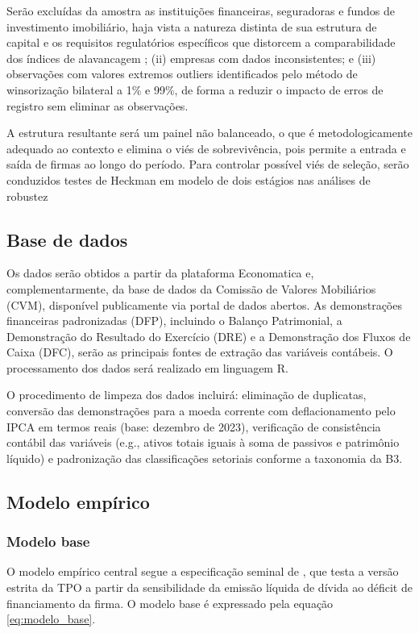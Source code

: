 \documentclass[a4paper,12pt]{article}
\begin{document}
Serão excluídas da amostra as instituições financeiras, seguradoras e fundos de investimento imobiliário, haja vista a natureza distinta de sua estrutura de capital e os requisitos regulatórios específicos que distorcem a comparabilidade dos índices de alavancagem \cite{AssafNeto2014}; (ii) empresas com dados inconsistentes; e (iii) observações com valores extremos outliers identificados pelo método de winsorização bilateral a 1\% e 99\%, de forma a reduzir o impacto de erros de registro sem eliminar as observações.

A estrutura resultante será um painel não balanceado, o que é metodologicamente adequado ao contexto e elimina o viés de sobrevivência, pois permite a entrada e saída de firmas ao longo do período. Para controlar possível viés de seleção, serão conduzidos testes de Heckman em modelo de dois estágios nas análises de robustez
\subsection{Base de dados}
Os dados serão obtidos a partir da plataforma Economatica e, complementarmente, da base de dados da Comissão de Valores Mobiliários (CVM), disponível publicamente via portal de dados abertos. As demonstrações financeiras padronizadas (DFP), incluindo o Balanço Patrimonial, a Demonstração do Resultado do Exercício (DRE) e a Demonstração dos Fluxos de Caixa (DFC), serão as principais fontes de extração das variáveis contábeis. O processamento dos dados será realizado em linguagem R.

O procedimento de limpeza dos dados incluirá: eliminação de duplicatas, conversão das demonstrações para a moeda corrente com deflacionamento pelo IPCA em termos reais (base: dezembro de 2023), verificação de consistência contábil das variáveis (e.g., ativos totais iguais à soma de passivos e patrimônio líquido) e padronização das classificações setoriais conforme a taxonomia da B3.
\subsection{Modelo empírico}
 
\subsubsection{Modelo base}
 
O modelo empírico central segue a especificação seminal de \cite{shyam1999}, que testa a versão estrita da TPO a partir da sensibilidade da emissão líquida de dívida ao déficit de financiamento da firma. O modelo base é expressado pela equação \ref{eq:modelo_base}.
 
\end{document}
